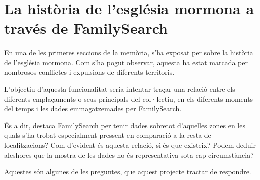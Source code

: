 \section{La història de l'església mormona a través de Family\-Search}

    \paragraph{}
    En una de les primeres seccions de la memòria, s'ha exposat per sobre la història de l'església mormona. Com s'ha pogut observar, aquesta ha estat marcada per nombrosos conflictes i expulsions de diferents territoris.

    L'objectiu d'aquesta funcionalitat seria intentar traçar una relació entre els di\-fe\-rents emplaçaments o seus principals del col·lectiu, en els diferents moments del temps i les dades emmagatzemades per FamilySearch.

    És a dir, destaca FamilySearch per tenir dades sobretot d'aquelles zones en les quals s'ha trobat especialment pressent en comparació a la resta de localitzacions? Com d'evident és aquesta relació, si és que existeix? Podem deduir aleshores que la mostra de les dades no és representativa sota cap circumstància?

    Aquestes són algunes de les preguntes, que aquest projecte tractar de respondre.
